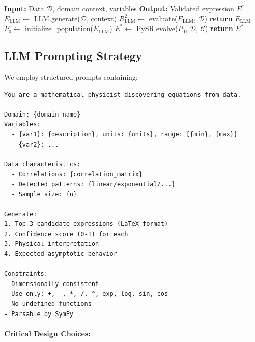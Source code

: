 \documentclass[twoside,11pt]{article}
\begin{document}
\begin{algorithm}[htbp]
\caption{LLM-Guided Symbolic Discovery}
\label{alg:hybrid}
\begin{algorithmic}[1]
\STATE \textbf{Input:} Data $\mathcal{D}$, domain context, variables
\STATE \textbf{Output:} Validated expression $E^*$
\STATE
\STATE $E_{\text{LLM}} \gets$ LLM\citep{kambhampati2024llms}.generate($\mathcal{D}$, context)
\STATE $R^2_{\text{LLM}} \gets$ evaluate($E_{\text{LLM}}$, $\mathcal{D}$)\citep{kambhampati2024llms}
    \STATE \textbf{return} $E_{\text{LLM}}$ \citep{kambhampati2024llms}
\ELSE
    \STATE $P_0 \gets$ initialize\_population($E_{\text{LLM}}$)\citep{kambhampati2024llms}
    \STATE $E^* \gets$ PySR.evolve($P_0$, $\mathcal{D}$, $\mathcal{C}$)
    \STATE \textbf{return} $E^*$ 
\ENDIF
\end{algorithmic}
\end{algorithm}

\subsection{LLM Prompting Strategy}\citep{kambhampati2024llms}

We employ structured prompts containing:

\begin{small}
\begin{verbatim}
You are a mathematical physicist discovering equations from data.

Domain: {domain_name}
Variables:
  - {var1}: {description}, units: {units}, range: [{min}, {max}]
  - {var2}: ...

Data characteristics:
  - Correlations: {correlation_matrix}
  - Detected patterns: {linear/exponential/...}
  - Sample size: {n}

Generate:
1. Top 3 candidate expressions (LaTeX format)
2. Confidence score (0-1) for each
3. Physical interpretation
4. Expected asymptotic behavior

Constraints:
- Dimensionally consistent
- Use only: +, -, *, /, ^, exp, log, sin, cos
- No undefined functions
- Parsable by SymPy
\end{verbatim}
\end{small}

\paragraph{Critical Design Choices:}
\end{document}
